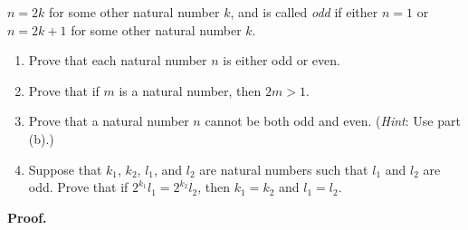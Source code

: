 \begin{enumerate}
                  $n = 2k$ for some other natural number $k$, and is called
                  \textit{odd} if either $n = 1$ or $n = 2k + 1$ for some other
                  natural number $k$.
                  \begin{enumerate}
                     \item Prove that each natural number $n$ is either odd or
                           even.
                     \item Prove that if $m$ is a natural number, then $2m > 1$.
                     \item Prove that a natural number $n$ cannot be both odd
                           and even. (\textit{Hint}: Use part (b).)
                     \item Suppose that $k_1$, $k_2$, $l_1$, and $l_2$ are
                           natural numbers such that $l_1$ and $l_2$ are odd.
                           Prove that if $2^{k_1}l_1 = 2^{k_2}l_2$, then
                           $k_1 = k_2$ and $l_1 = l_2$.
                  \end{enumerate}

      \textbf{Proof.}


\end{enumerate}
